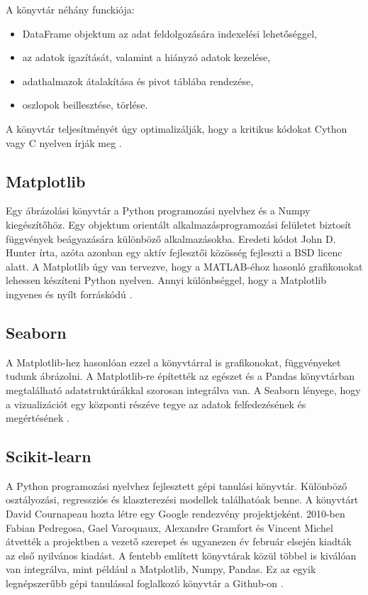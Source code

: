 A könyvtár néhány funckiója:
\begin{itemize}
    \item DataFrame objektum az adat feldolgozására indexelési lehetőséggel,
    \item az adatok igazítását, valamint a hiányzó adatok kezelése,
    \item adathalmazok átalakítása és pivot táblába rendezése,
    \item oszlopok beillesztése, törlése.
\end{itemize}

A könyvtár teljesítményét úgy optimalizálják, hogy a kritikus kódokat Cython vagy C nyelven írják meg \cite{pandas}.

\subsection{Matplotlib}
Egy ábrázolási könyvtár a Python programozási nyelvhez és a Numpy kiegészítőhöz. Egy objektum orientált alkalmazásprogramozási felületet biztosít függvények beágyazására különböző alkalmazásokba. Eredeti kódot John D. Hunter írta, azóta azonban egy aktív fejlesztői közösség fejleszti a BSD licenc alatt. A Matplotlib úgy van tervezve, hogy a MATLAB-éhoz hasonló grafikonokat lehessen készíteni Python nyelven. Annyi különbséggel, hogy a Matplotlib ingyenes és nyílt forráskódú \cite{matplotlib}.

\subsection{Seaborn}
A Matplotlib-hez hasonlóan ezzel a könyvtárral is grafikonokat, függvényeket tudunk ábrázolni. A Matplotlib-re építették az egészet és a Pandas könyvtárban megtalálható adatstruktúrákkal szorosan integrálva van. A Seaborn lényege, hogy a vizualizációt egy központi részéve tegye az adatok felfedezésének és megértésének \cite{seaborn}.

\subsection{Scikit-learn}
A Python programozási nyelvhez fejlesztett gépi tanulási könyvtár. Különböző osztályozási, regressziós és klaszterezési modellek találhatóak benne. A könyvtárt David Cournapeau hozta létre egy Google rendezvény projektjeként. 2010-ben Fabian Pedregosa, Gael Varoquaux, Alexandre Gramfort és Vincent Michel átvették a projektben a vezető szerepet és ugyanezen év február elsején kiadták az első nyilvános kiadást. A fentebb említett könyvtárak közül többel is kiválóan van integrálva, mint például a Matplotlib, Numpy, Pandas. Ez az egyik legnépszerűbb gépi tanulással foglalkozó könyvtár a Github-on \cite{scikit-learn}.

